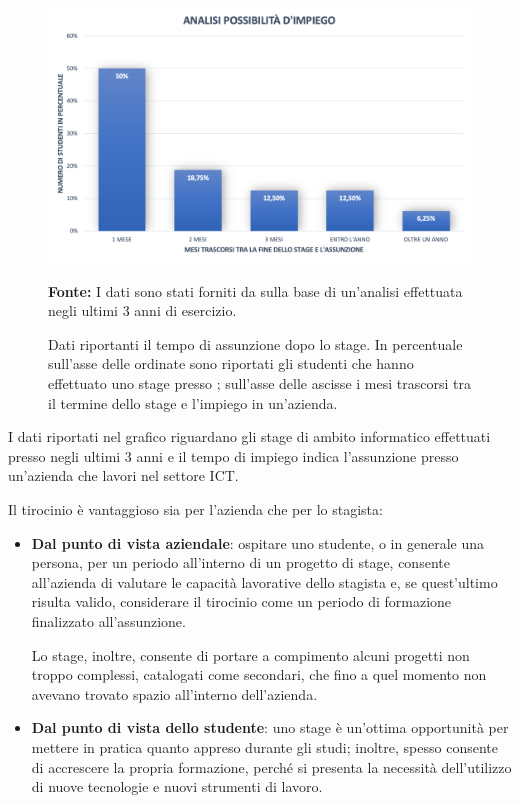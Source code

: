 \begin{figure}[H]
	\begin{center}
	\includegraphics[scale=0.45]{immagini/grafico_stage.png}
	\caption{Dati riportanti il tempo di assunzione dopo lo stage. In percentuale sull'asse delle ordinate sono riportati gli studenti che hanno effettuato uno stage presso \lab{}; sull'asse delle ascisse i mesi trascorsi tra il termine dello stage e l'impiego in un'azienda.}
		\small{\textbf{Fonte:} I dati sono stati forniti da \lab{} sulla base di un'analisi effettuata negli ultimi 3 anni di esercizio.}
	\end{center}
\end{figure}

I dati riportati nel grafico riguardano gli stage di ambito informatico effettuati presso \lab{} negli ultimi 3 anni e il tempo di impiego indica l'assunzione presso un'azienda che lavori nel settore ICT.

\medskip

Il tirocinio è vantaggioso sia per l'azienda che per lo stagista:
\begin{itemize}
\item \textbf{Dal punto di vista aziendale}: ospitare uno studente, o in generale una persona, per un periodo all'interno di un progetto di stage, consente all'azienda di valutare le capacità lavorative dello stagista e, se quest'ultimo risulta valido, considerare il tirocinio come un periodo di formazione finalizzato all'assunzione.

Lo stage, inoltre, consente di portare a compimento alcuni progetti non troppo complessi, catalogati come secondari, che fino a quel momento non avevano trovato spazio all'interno dell'azienda.
\item \textbf{Dal punto di vista dello studente}: uno stage è un'ottima opportunità per mettere in pratica quanto appreso durante gli studi; inoltre, spesso consente di accrescere la propria formazione, perché si presenta la necessità dell'utilizzo di nuove tecnologie e nuovi strumenti di lavoro.
\end{itemize}

